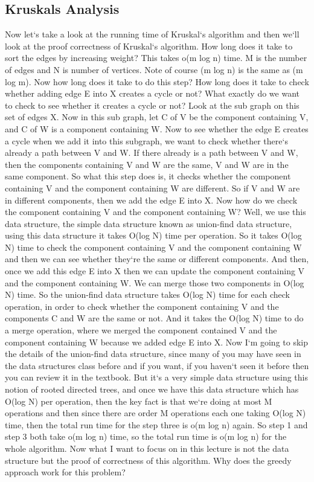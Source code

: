 \subsection{Kruskals  Analysis}
Now let`s take a look at the running time of Kruskal`s algorithm and then we`ll look at the proof correctness of Kruskal`s algorithm.
How long does it take to sort the edges by increasing weight? This takes o(m log n) time.
M is the number of edges and N is number of vertices.
Note of course (m log n) is the same as (m log m).
Now how long does it take to do this step? How long does it take to check whether adding edge E into X creates a cycle or not? What exactly do we want to check to see whether it creates a cycle or not? Look at the sub graph on this set of edges X\@.
Now in this sub graph, let C of V be the component containing V, and C of W is a component containing W\@.
Now to see whether the edge E creates a cycle when we add it into this subgraph, we want to check whether there`s already a path between V and W\@.
If there already is a path between V and W, then the components containing V and W are the same, V and W are in the same component.
So what this step does is, it checks whether the component containing V and the component containing W are different.
So if V and W are in different components, then we add the edge E into X\@.
Now how do we check the component containing V and the component containing W? Well, we use this data structure, the simple data structure known as union-find data structure, using this data structure it takes O(log N) time per operation.
So it takes O(log N) time to check the component containing V and the component containing W and then we can see whether they`re the same or different components.
And then, once we add this edge E into X then we can update the component containing V and the component containing W\@.
We can merge those two components in O(log N) time.
So the union-find data structure takes O(log N) time for each check operation, in order to check whether the component containing V and the components C and W are the same or not.
And it takes the O(log N) time to do a merge operation, where we merged the component contained V and the component containing W because we added edge E into X\@.
Now I`m going to skip the details of the union-find data structure, since many of you may have seen in the data structures class before and if you want, if you haven`t seen it before then you can review it in the textbook.
But it`s a very simple data structure using this notion of rooted directed trees, and once we have this data structure which has O(log N) per operation, then the key fact is that we`re doing at most M operations and then since there are order M operations each one taking O(log N) time, then the total run time for the step three is o(m log n) again.
So step 1 and step 3 both take o(m log n) time, so the total run time is o(m log n) for the whole algorithm.
Now what I want to focus on in this lecture is not the data structure but the proof of correctness of this algorithm.
Why does the greedy approach work for this problem?


